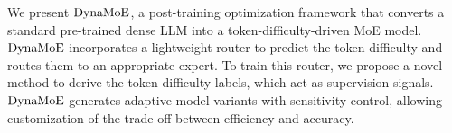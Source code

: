 We present $\operatorname{DynaMoE}$, a post-training optimization framework that converts a standard pre-trained dense LLM into a token-difficulty-driven MoE model. $\operatorname{DynaMoE}$ incorporates a lightweight router to predict the token difficulty and routes them to an appropriate expert. To train this router, we propose a novel method to derive the token difficulty labels, which act as supervision signals. $\operatorname{DynaMoE}$ generates adaptive model variants with sensitivity control, allowing customization of the trade-off between efficiency and accuracy. 


